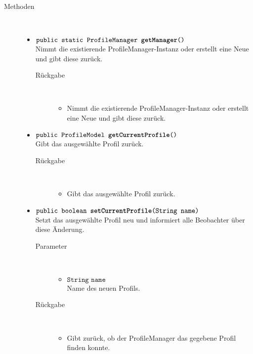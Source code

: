 \begin{description}
\item[Methoden] \hfill \\
	\vspace{-.8cm}
	\begin{itemize}
		\item $\texttt{public static ProfileManager \textbf{getManager}()}$ \\ Nimmt die existierende ProfileManager-Instanz oder erstellt eine Neue und gibt diese zurück.
		\begin{description}
			\item[Rückgabe] \hfill \\
			\vspace{-.8cm}
			\begin{itemize}
				\item  Nimmt die existierende ProfileManager-Instanz oder erstellt eine Neue und gibt diese zurück.
			\end{itemize}
		\end{description}
		
		\item $\texttt{public ProfileModel \textbf{getCurrentProfile}()}$ \\ Gibt das ausgewählte Profil zurück.
		\begin{description}
			\item[Rückgabe] \hfill \\
			\vspace{-.8cm}
			\begin{itemize}
				\item Gibt das ausgewählte Profil zurück.
			\end{itemize}
		\end{description}
		
		\item $\texttt{public boolean \textbf{setCurrentProfile}(String name)}$ \\ Setzt das ausgewählte Profil neu und informiert alle Beobachter über diese Änderung.
		\begin{description}
			\item[Parameter] \hfill \\
			\vspace{-.8cm}
			\begin{itemize}
				\item $\texttt{String name}$ \\ Name des neuen Profils.
			\end{itemize}
			\item[Rückgabe] \hfill \\
			\vspace{-.8cm}
			\begin{itemize}
				\item Gibt zurück, ob der ProfileManager das gegebene Profil finden konnte.
			\end{itemize}
		\end{description}
		

\end{itemize}
\end{description}
